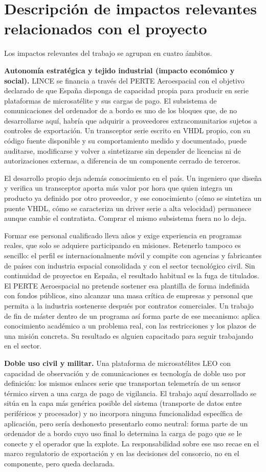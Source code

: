 \section{Descripción de impactos relevantes relacionados con el proyecto}
\normalsize{%
Los impactos relevantes del trabajo se agrupan en cuatro ámbitos.

\textbf{Autonomía estratégica y tejido industrial (impacto económico y social).} LINCE se financia
a través del PERTE Aeroespacial con el objetivo declarado de que España disponga de capacidad
propia para producir en serie plataformas de microsatélite y sus cargas de pago. El subsistema de
comunicaciones del ordenador de a bordo es uno de los bloques que, de no desarrollarse aquí, habría
que adquirir a proveedores extracomunitarios sujetos a controles de exportación. Un transceptor
serie escrito en VHDL propio, con su código fuente disponible y su comportamiento medido y
documentado, puede auditarse, modificarse y volver a sintetizarse sin depender de licencias ni de
autorizaciones externas, a diferencia de un componente cerrado de terceros.

El desarrollo propio deja además conocimiento en el país. Un ingeniero que diseña y verifica un
transceptor aporta más valor por hora que quien integra un producto ya definido por otro proveedor,
y ese conocimiento (cómo se sintetiza un puente VHDL, cómo se caracteriza un driver serie a alta
velocidad) permanece aunque cambie el contratista. Comprar el mismo subsistema fuera no lo deja.

Formar ese personal cualificado lleva años y exige experiencia en programas reales, que solo se
adquiere participando en misiones. Retenerlo tampoco es sencillo: el perfil es internacionalmente
móvil y compite con agencias y fabricantes de países con industria espacial consolidada y con el
sector tecnológico civil. Sin continuidad de proyectos en España, el resultado habitual es la fuga
de titulados. El PERTE Aeroespacial no pretende sostener esa plantilla de forma indefinida con
fondos públicos, sino alcanzar una masa crítica de empresas y personal que permita a la industria
sostenerse después por contratos comerciales. Un trabajo de fin de máster dentro de un programa así
forma parte de ese mecanismo: aplica conocimiento académico a un problema real, con las
restricciones y los plazos de una misión concreta. Su resultado es alguien capacitado para seguir
trabajando en el sector.

\textbf{Doble uso civil y militar.} Una plataforma de microsatélites LEO con capacidad de
observación y de comunicaciones es tecnología de doble uso por definición: los mismos enlaces serie
que transportan telemetría de un sensor térmico sirven a una carga de pago de vigilancia. El
trabajo aquí desarrollado se sitúa en la capa más genérica posible del sistema (transporte de datos
entre periféricos y procesador) y no incorpora ninguna funcionalidad específica de aplicación, pero
sería deshonesto presentarlo como neutral: forma parte de un ordenador de a bordo cuyo uso final lo
determina la carga de pago que se le conecte y el operador que la explote. La responsabilidad sobre
ese uso recae en el marco regulatorio de exportación y en las decisiones del consorcio, no en el
componente, pero queda declarada.

}
